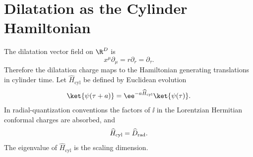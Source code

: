 \section{Dilatation as the Cylinder Hamiltonian}

The dilatation vector field on \(\R^D\) is
\[
  x^\mu\partial_\mu=r\partial_r=\partial_\tau.
\]
Therefore the dilatation charge maps to the Hamiltonian generating
translations in cylinder time.  Let \(\widehat H_{\mathrm{cyl}}\) be defined
by Euclidean evolution
\[
  \ket{\psi(\tau+a)}
  =
  \ee^{-a\widehat H_{\mathrm{cyl}}}\ket{\psi(\tau)} .
\]
In radial-quantization conventions the factors of \(\ii\) in the Lorentzian
Hermitian conformal charges are absorbed, and
\begin{equation}
  \widehat H_{\mathrm{cyl}}=\widehat D_{\rm rad}.
  \label{eq:dilatation-cylinder-hamiltonian}
\end{equation}
The eigenvalue of \(\widehat H_{\mathrm{cyl}}\) is the scaling dimension.

